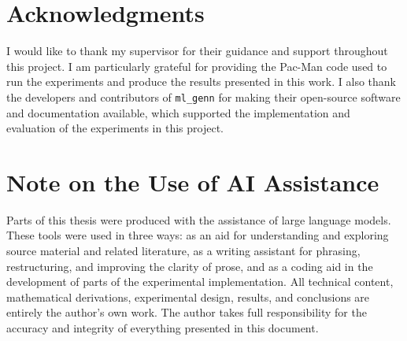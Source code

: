 \documentclass[11pt]{report}
\begin{document}
\chapter*{Acknowledgments}

I would like to thank my supervisor for their guidance and support throughout this project. I am particularly grateful for providing the Pac-Man code used to run the experiments and produce the results presented in this work.
I also thank the developers and contributors of \texttt{ml\_genn} \cite{Yavuz2016GeNN} for making their open-source software and documentation available, which supported the implementation and evaluation of the experiments in this project.

\clearpage

\chapter*{Note on the Use of AI Assistance}

Parts of this thesis were produced with the assistance of large language models. These tools were used in three ways: as an
aid for understanding and exploring source material and related literature, as a
writing assistant for phrasing, restructuring, and improving the clarity of prose,
and as a coding aid in the development of parts of the experimental implementation.
All technical content, mathematical derivations, experimental design, results, and
conclusions are entirely the author's own work. The author takes full responsibility
for the accuracy and integrity of everything presented in this document.

\tableofcontents
\listoffigures
{}

\listoftables
{}







\clearpage
{}

\end{document}
